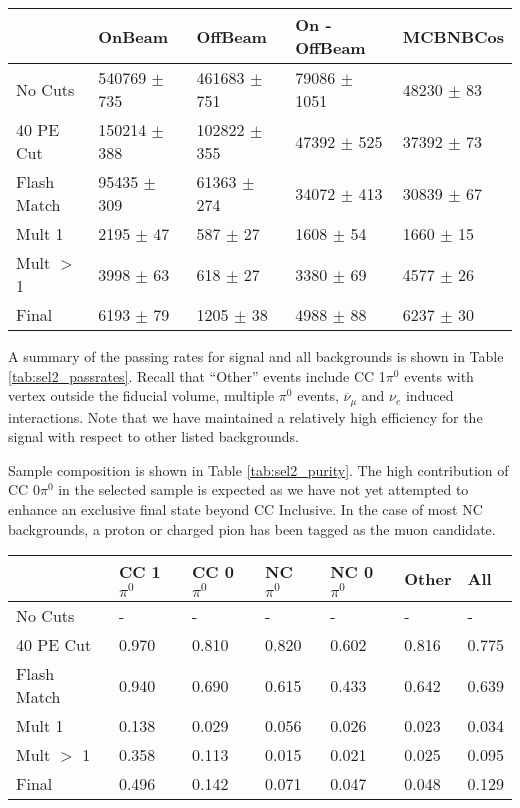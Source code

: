 \begin{table*} 
 \centering
 \begin{tabular}{| l | l | l | l | l |}
  \hline
   & OnBeam & OffBeam & On - OffBeam & MCBNBCos \\ [0.1ex] \hline
No Cuts & 540769 $\pm$ 735 & 461683 $\pm$ 751 & 79086 $\pm$ 1051 & 48230 $\pm$ 83 \\ 
40 PE Cut & 150214 $\pm$ 388 & 102822 $\pm$ 355 & 47392 $\pm$ 525 & 37392 $\pm$ 73  \\ 
Flash Match & 95435 $\pm$ 309 & 61363 $\pm$ 274 & 34072 $\pm$ 413 & 30839 $\pm$ 67 \\ \hline
Mult 1 & 2195 $\pm$ 47 & 587 $\pm$ 27 & 1608 $\pm$ 54  & 1660 $\pm$ 15  \\ 
Mult $>$ 1 & 3998 $\pm$ 63  & 618 $\pm$ 27 & 3380 $\pm$ 69 & 4577 $\pm$ 26 \\ 
Final & 6193 $\pm$ 79 & 1205 $\pm$ 38 & 4988 $\pm$ 88 & 6237 $\pm$ 30  \\ \hline
 \end{tabular}
 \end{table*}

\par A summary of the passing rates for signal and all backgrounds is shown in Table \ref{tab:sel2_passrates}.  Recall that ``Other'' events include CC 1$\pi^0$ events with vertex outside the fiducial volume, multiple $\pi^0$ events, $\overline{\nu}_\mu$ and $\nu_e$ induced interactions.  Note that we have maintained a relatively high efficiency for the signal with respect to other listed backgrounds.  
\par Sample composition is shown in Table \ref{tab:sel2_purity}. The high contribution of CC 0$\pi^0$ in the selected sample is expected as we have not yet attempted to enhance an exclusive final state beyond CC Inclusive. In the case of most NC backgrounds, a proton or charged pion has been tagged as the muon candidate.

\begin{table*}
\centering
{}
 \begin{tabular}{| l | l | l |l|l|l|l|}
 \hline
 & CC 1$\pi^0$ & CC 0$\pi^0$ & NC $\pi^0$ & NC 0$\pi^0$ & Other & All \\ [0.1ex] \hline
No Cuts & - & - & - & - & - & -\\
40 PE Cut & 0.970 & 0.810 & 0.820 & 0.602 & 0.816 & 0.775 \\ 
Flash Match & 0.940 & 0.690 & 0.615 & 0.433 & 0.642 & 0.639 \\ \hline
Mult 1 & 0.138 & 0.029 & 0.056 & 0.026 & 0.023 & 0.034 \\ 
Mult $>$ 1 & 0.358 & 0.113 & 0.015 & 0.021 & 0.025 & 0.095 \\ 
Final & 0.496 & 0.142 & 0.071 & 0.047 & 0.048 & 0.129 \\ \hline
\end{tabular}
\end{table*}


